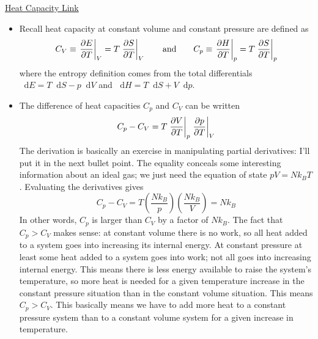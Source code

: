 \documentclass[11pt, a4paper]{article}
\newcommand{\diff}{\mathop{}\!\mathrm{d}} %
\begin{document}
\href{https://faculty.uca.edu/saddison/ThermalPhysics/Heat\%20Capacity.pdf}{Heat Capacity Link}

\begin{itemize}
	\item Recall heat capacity at constant volume and constant pressure are defined as
	\begin{equation*}
		C_{V} \equiv \eval{\pdv{E}{T}}_{V} = T \eval{\pdv{S}{T}}_{V} \qquad \text{and} \qquad C_{p} \equiv \eval{\pdv{H}{T}}_{p} = T \eval{\pdv{S}{T}}_{p}
	\end{equation*}
	where the entropy definition comes from the total differentials $ \diff E = T \diff S - p \diff V $ and $ \diff H = T \diff S + V \diff p $.
	
	\item The difference of heat capacities $ C_{p} $ and $ C_{V} $ can be written
	\begin{equation*}
		C_{p} - C_{V} = T \eval{\pdv{V}{T}}_{p}\eval{\pdv{p}{T}}_{V}
	\end{equation*}
	The derivation is basically an exercise in manipulating partial derivatives: I'll put it in the next bullet point. The equality conceals some interesting information about an ideal gas; we just need the equation of state $ pV = Nk_{B}T $. Evaluating the derivatives gives
	\begin{equation*}
		C_{p} - C_{V} = T \left(\frac{Nk_{B}}{p}\right) \left(\frac{Nk_{B}}{V}\right) = Nk_{B}
	\end{equation*}
	In other words, $ C_{p} $ is larger than $ C_{V} $ by a factor of $ Nk_{B} $. The fact that $ C_{p} > C_{V} $ makes sense: at constant volume there is no work, so all heat added to a system goes into increasing its internal energy. At constant pressure at least some heat added to a system goes into work; not all goes into increasing internal energy. This means there is less energy available to raise the system's temperature, so more heat is needed for a given temperature increase in the constant pressure situation than in the constant volume situation. This means $ C_{p} > C_{V} $. This basically means we have to add more heat to a constant pressure system than to a constant volume system for a given increase in temperature.
	

\end{itemize}
\end{document}
